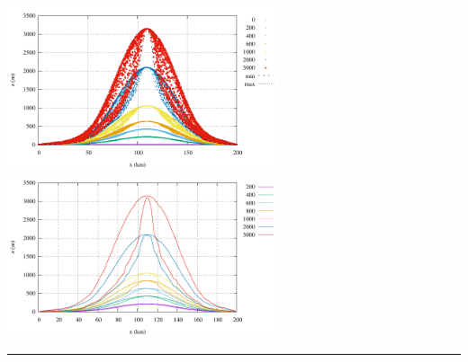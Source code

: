 \begin{center}
\includegraphics[width=8cm]{python_codes/fieldstone_140/results/exp5/elevation.pdf}
\includegraphics[width=8cm]{python_codes/fieldstone_140/results/exp5/elevation2.pdf}
\end{center}



\par\noindent\rule{\textwidth}{0.4pt}

\vspace{.5cm}

